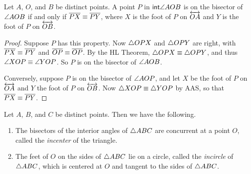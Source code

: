 \begin{prop}
Let \(A\), \(O\), and \(B\) be distinct points. A point \(P\) in \(\mathsf{int}\angle{AOB}\) is on the bisector of \(\angle{AOB}\) if and only if \(\overline{PX} \equiv \overline{PY}\), where \(X\) is the foot of \(P\) on \(\overleftrightarrow{OA}\) and \(Y\) is the foot of \(P\) on \(\overleftrightarrow{OB}\).
\end{prop}

\begin{proof}
Suppose \(P\) has this property. Now \(\bigtriangleup{OPX}\) and \(\bigtriangleup{OPY}\) are right, with \(\overline{PX} \equiv \overline{PY}\) and \(\overline{OP} \equiv \overline{OP}\). By the HL Theorem, \(\bigtriangleup{OPX} \equiv \bigtriangleup{OPY}\), and thus \(\angle{XOP} \equiv \angle{YOP}\). So \(P\) is on the bisector of \(\angle{AOB}\).

Conversely, suppose \(P\) is on the bisector of \(\angle{AOP}\), and let \(X\) be the foot of \(P\) on \(\overleftrightarrow{OA}\) and \(Y\) the foot of \(P\) on \(\overleftrightarrow{OB}\). Now \(\bigtriangleup{XOP} \equiv \bigtriangleup{YOP}\) by AAS, so that \(\overline{PX} \equiv \overline{PY}\). 
\end{proof}

\begin{construct}
Let \(A\), \(B\), and \(C\) be distinct points. Then we have the following.
\begin{enumerate}
\item The bisectors of the interior angles of \(\bigtriangleup{ABC}\) are concurrent at a point \(O\), called the \emph{incenter} of the triangle.

\item The feet of \(O\) on the sides of \(\bigtriangleup{ABC}\) lie on a circle, called the \emph{incircle} of \(\bigtriangleup{ABC}\), which is centered at \(O\) and tangent to the sides of \(\bigtriangleup{ABC}\).
\end{enumerate}
\end{construct}

